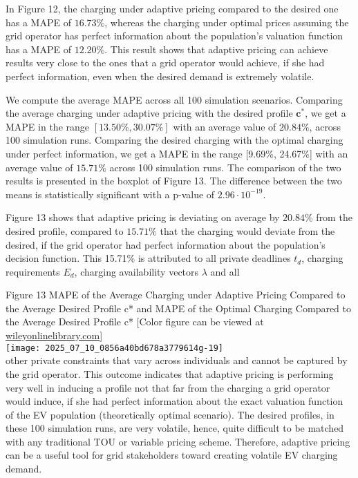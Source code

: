 \documentclass[10pt]{article}
\begin{document}
In Figure 12, the charging under adaptive pricing compared to the desired one has a MAPE of $16.73 \%$, whereas the charging under optimal prices assuming the grid operator has perfect information about the population's valuation function has a MAPE of $12.20 \%$. This result shows that adaptive pricing can achieve results very close to the ones that a grid operator would achieve, if she had perfect information, even when the desired demand is extremely volatile.

We compute the average MAPE across all 100 simulation scenarios. Comparing the average charging under adaptive pricing with the desired profile $\mathbf{c}^{*}$, we get a MAPE in the range $[13.50 \%, 30.07 \%]$ with an average value of $20.84 \%$, across 100 simulation runs. Comparing the desired charging with the optimal charging under perfect information, we get a MAPE in the range [9.69\%, 24.67\%] with an average value of $15.71 \%$ across 100 simulation runs. The comparison of the two results is presented in the boxplot of Figure 13. The difference between the two means is statistically significant with a p-value of $2.96 \cdot 10^{-19}$.

Figure 13 shows that adaptive pricing is deviating on average by $20.84 \%$ from the desired profile, compared to $15.71 \%$ that the charging would deviate from the desired, if the grid operator had perfect information about the population's decision function. This 15.71\% is attributed to all private deadlines $t_{d}$, charging requirements $E_{d}$, charging availability vectors $\lambda$ and all

Figure 13 MAPE of the Average Charging under Adaptive Pricing Compared to the Average Desired Profile c* and MAPE of the Optimal Charging Compared to the Average Desired Profile c* [Color figure can be viewed at \href{http://wileyonlinelibrary.com}{wileyonlinelibrary.com}]\\
\texttt{[image: 2025\_07\_10\_0856a40bd678a3779614g-19]}\\
other private constraints that vary across individuals and cannot be captured by the grid operator. This outcome indicates that adaptive pricing is performing very well in inducing a profile not that far from the charging a grid operator would induce, if she had perfect information about the exact valuation function of the EV population (theoretically optimal scenario). The desired profiles, in these 100 simulation runs, are very volatile, hence, quite difficult to be matched with any traditional TOU or variable pricing scheme. Therefore, adaptive pricing can be a useful tool for grid stakeholders toward creating volatile EV charging demand.
\end{document}

